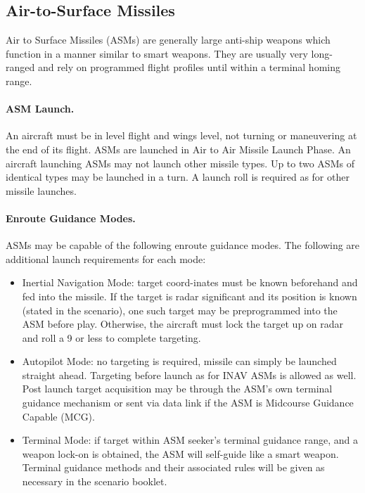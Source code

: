 \begin{advancedrules}

\section{Air-to-Surface Missiles}

Air to Surface Missiles (ASMs) are generally large anti-ship weapons which function in a manner similar to smart weapons. They are usually very long-ranged and rely on programmed flight profiles until within a terminal homing range.

\paragraph{ASM Launch.} An aircraft must be in level flight and wings level, not turning or maneuvering at the end of its flight. ASMs are launched in Air to Air Missile Launch Phase. An aircraft launching ASMs may not launch other missile types. Up to two ASMs of identical types may be launched in a turn. A launch roll is required as for other missile launches.

\paragraph{Enroute Guidance Modes.} ASMs may be capable of the following enroute guidance modes. The following are additional launch requirements for each mode:

\begin{itemize}
    \item Inertial Navigation Mode: target coord-inates must be known beforehand and fed into the missile. If the target is radar significant and its position is known (stated in the scenario), one such target may be preprogrammed into the ASM before play. Otherwise, the aircraft must lock the target up on radar and roll a 9 or less to complete targeting.

    \item Autopilot Mode: no targeting is required, missile can simply be launched straight ahead. Targeting before launch as for INAV ASMs is allowed as well. Post launch target acquisition may be through the ASM's own terminal guidance mechanism or sent via data link if the ASM is Midcourse Guidance Capable (MCG).

    \item Terminal Mode: if target within ASM seeker's terminal guidance range, and a weapon lock-on is obtained, the ASM will self-guide like a smart weapon. Terminal guidance methods and their associated rules will be given as necessary in the scenario booklet.


\end{itemize}
\end{advancedrules}
